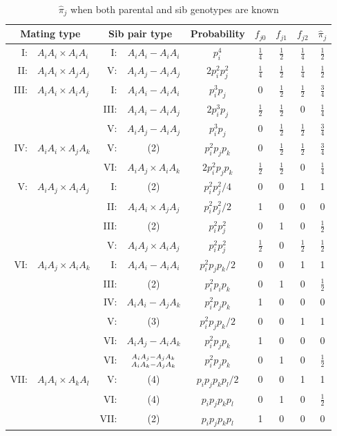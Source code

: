 \begin{table}[h]\centering
\caption{$\hat\pi_j$ when both parental and sib genotypes are known\label{table2}}
\begin{tabular}{rlrcccccc}
\hline
\multicolumn{2}{c}{Mating type} & 
\multicolumn{2}{c}{Sib pair type} & Probability & $f_{j0}$ & $f_{j1}$ & $f_{j2}$ & $\hat\pi_j$ \\
\hline
I: & $A_iA_i\times A_iA_i$ & I: & $A_iA_i-A_iA_i$ & $p_i^4$ & $\frac{1}{4}$ & $\frac{1}{2}$ & $\frac{1}{4}$ & $\frac{1}{2}$ \\
II: & $A_iA_i\times A_jA_j$ & V: & $A_iA_j-A_iA_j$ & $2p_i^2p_j^2$ & $\frac{1}{4}$ & $\frac{1}{2}$ & $\frac{1}{4}$ & $\frac{1}{2}$ \\
III: & $A_iA_i\times A_iA_j$ & I: & $A_iA_i-A_iA_i$ & $p_i^3p_j$ & 0 & $\frac{1}{2}$ & $\frac{1}{2}$ & $\frac{3}{4}$ \\
                             && III: & $A_iA_i-A_iA_j$ & $2p_i^3p_j$ & $\frac{1}{2}$ & $\frac{1}{2}$ & 0 & $\frac{1}{4}$ \\
                             && V: & $A_iA_j-A_iA_j$ & $p_i^3p_j$ & 0 & $\frac{1}{2}$ & $\frac{1}{2}$ & $\frac{3}{4}$ \\
IV: & $A_iA_i\times A_jA_k$ & V: & (2) & $p_i^2p_jp_k$ & 0 & $\frac{1}{2}$ & $\frac{1}{2}$ & $\frac{3}{4}$ \\
                            && VI: & $A_iA_j\times A_iA_k$ & $2p_i^2p_jp_k$ & $\frac{1}{2}$ & $\frac{1}{2}$ & 0 & $\frac{1}{4}$ \\
V: & $A_iA_j\times A_iA_j$ & I: & (2) & $p_i^2p_j^2/4$ & 0 & 0 & 1 & 1 \\
                            && II: & $A_iA_i\times A_jA_j$ & $p_i^2p_j^2/2$ & 1 & 0 & 0 & 0 \\
                            && III: & (2) & $p_i^2p_j^2$ & 0 & 1 & 0 & $\frac{1}{2}$ \\
                            && V: & $A_iA_j\times A_iA_j$ & $p_i^2p_j^2$ & $\frac{1}{2}$ & 0 & $\frac{1}{2}$ & $\frac{1}{2}$ \\
VI: & $A_iA_j\times A_iA_k$ & I: & $A_iA_i-A_iA_i$ & $p_i^2p_jp_k/2$ & 0 & 0 & 1 & 1 \\
                          &&III: & (2) & $p_i^2p_ip_k$ & 0 & 1 & 0 & $\frac{1}{2}$ \\
                           &&IV: & $A_iA_i-A_jA_k$ & $p_i^2p_jp_k$ & 1 & 0 & 0 & 0 \\
                      &&V: & (3) & $p_i^2p_jp_k/2$ & 0 & 0 & 1 & 1 \\
                           &&VI: & $A_iA_j-A_iA_k$ & $p_i^2p_jp_k$ & 1 & 0 & 0 & 0 \\
                           &&VI: & ${A_iA_j-A_jA_k} \atop {A_iA_k-A_jA_k}$ & $p_i^2p_jp_k$ & 0 & 1 & 0 & $\frac{1}{2}$ \\
VII: & $A_iA_i\times A_kA_l$ & V: & (4) & $p_ip_jp_kp_l/2$ & 0 & 0 & 1 & 1 \\
                            &&VI: & (4) & $p_ip_jp_kp_l$ & 0 & 1 & 0 & $\frac{1}{2}$ \\
                           &&VII: & (2) & $p_ip_jp_kp_l$ & 1 & 0 & 0 & 0 \\
\hline
\end{tabular}
\end{table}

